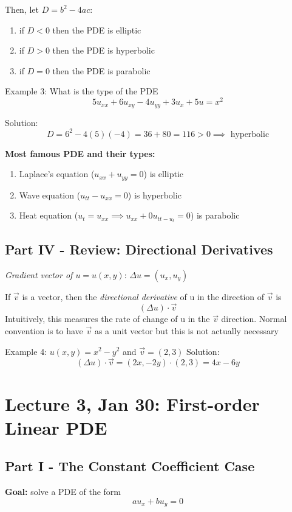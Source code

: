\documentclass[12pt]{article}
\begin{document}
Then, let $D = b^2 - 4ac$:
\begin{enumerate}
    \item if $D < 0$ then the PDE is elliptic
    \item if $D > 0$ then the PDE is hyperbolic
    \item if $D = 0$ then the PDE is parabolic
\end{enumerate}

Example 3: What is the type of the PDE
\[5u_{xx} + 6u_{xy} - 4u_{yy} + 3u_x + 5u = x^2\]

Solution:
\[D = 6^2 - 4(5)(-4) = 36 + 80 = 116 > 0 \implies \boxed{\text{  hyperbolic}}\]

\textbf{Most famous PDE and their types:}
\begin{enumerate}
    \item Laplace's equation ($u_{xx} + u_{yy} = 0$) is elliptic
    \item Wave equation ($u_{tt} - u_{xx} = 0$) is hyperbolic
    \item Heat equation ($u_t = u_{xx} \implies u_{xx} + 0u_{tt - u_t} = 0$) is parabolic 
\end{enumerate}

\subsection*{Part IV - Review: Directional Derivatives}
\emph{Gradient vector of $u= u(x, y)$}: $\Delta u = (u_x, u_y)$

If $\vec{v}$ is a vector, then the \emph{directional derivative} of u in the direction of $\vec{v}$ is
\[(\Delta u)\cdot \vec{v}\]
Intuitively, this measures the rate of change of u in the $\vec{v}$ direction. Normal convention is to have $\vec{v}$ as a unit vector but this is not actually necessary

Example 4: $u(x, y) = x^2 - y^2$ and $\vec{v} = (2,3)$
Solution:
\[(\Delta u)\cdot \vec{v} = (2x, -2y) \cdot (2, 3) = \boxed{4x-6y}\]

\section*{Lecture 3, Jan 30: First-order Linear PDE}
\subsection*{Part I - The Constant Coefficient Case}
\textbf{Goal:} solve a PDE of the form 
\[au_x + bu_y = 0\]
\end{document}
